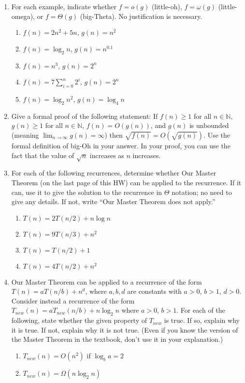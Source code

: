 \documentclass{article}
\begin{document}
\begin{enumerate}
    \item For each example, indicate whether $f = o(g)$ (little-oh), $f = \omega(g)$ (little-omega), or $f = \Theta(g)$ (big-Theta). No justification is necessary.
    \begin{enumerate}
        \item $f(n) = 2n^2 + 5n$, $g(n) = n^2$
        \item $f(n) = \log_2 n$, $g(n) = n^{0.1}$
        \item $f(n) = n^3$, $g(n) = 2^n$
        \item $f(n) = 7 \sum_{i=0}^n 2^i$, $g(n) = 2^n$
        \item $f(n) = \log_2 n^2$, $g(n) = \log_4 n$
    \end{enumerate}

    \item Give a formal proof of the following statement: If $f(n) \geq 1$ for all $n \in \mathbb{N}$, $g(n) \geq 1$ for all $n \in \mathbb{N}$, $f(n) = O(g(n))$, and $g(n)$ is unbounded (meaning $\lim_{n \to \infty} g(n) = \infty$) then $\sqrt{f(n)} = O(\sqrt{g(n)})$.
    Use the formal definition of big-Oh in your answer. In your proof, you can use the fact that the value of $\sqrt{n}$ increases as $n$ increases.


    \item For each of the following recurrences, determine whether Our Master Theorem (on the last page of this HW) can be applied to the recurrence. If it can, use it to give the solution to the recurrence in $\Theta$ notation; no need to give any details. If not, write “Our Master Theorem does not apply.”
    \begin{enumerate}
        \item $T(n) = 2T(n/2) + n \log n$
        \item $T(n) = 9T(n/3) + n^2$
        \item $T(n) = T(n/2) + 1$
        \item $T(n) = 4T(n/2) + n^2$
    \end{enumerate}

    \item Our Master Theorem can be applied to a recurrence of the form $T(n) = aT(n/b) + n^d$, where $a, b, d$ are constants with $a > 0$, $b > 1$, $d > 0$. Consider instead a recurrence of the form $T_{new}(n) = aT_{new}(n/b) + n \log_2 n$ where $a > 0$, $b > 1$.
    For each of the following, state whether the given property of $T_{new}$ is true. If so, explain why it is true. If not, explain why it is not true. (Even if you know the version of the Master Theorem in the textbook, don’t use it in your explanation.)
    \begin{enumerate}
        \item $T_{new}(n) = O(n^2)$ if $\log_b a = 2$
        \item $T_{new}(n) = \Omega(n \log_2 n)$
    \end{enumerate}


\end{enumerate}
\end{document}

